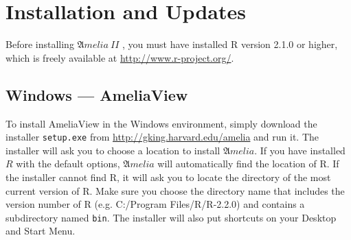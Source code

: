 \documentclass[12pt,titlepage]{article}
\newcommand{\AmeliaII}{\ensuremath{\mathfrak Amelia~II} }
\begin{document}

\section{Installation and Updates}
\label{sec:install}

Before installing \AmeliaII, you must have installed R version 2.1.0
or higher, which is freely available at
\url{http://www.r-project.org/}.  
\subsection{Windows --- AmeliaView}
\label{sec:win-install}
To install AmeliaView in the Windows environment, simply download the
installer \texttt{setup.exe} from
\url{http://gking.harvard.edu/amelia} and run it.  The installer will
ask you to choose a location to install ${\mathfrak Amelia}$.  If you
have installed $R$ with the default options, ${\mathfrak Amelia}$ will
automatically find the location of R.  If the installer cannot find R,
it will ask you to locate the directory of the most current version of
R.  Make sure you choose the directory name that includes the version
number of R (e.g. C:/Program Files/R/R-2.2.0) and contains a
subdirectory named \texttt{bin}.  The installer will also put
shortcuts on your Desktop and Start Menu.
\end{document}
